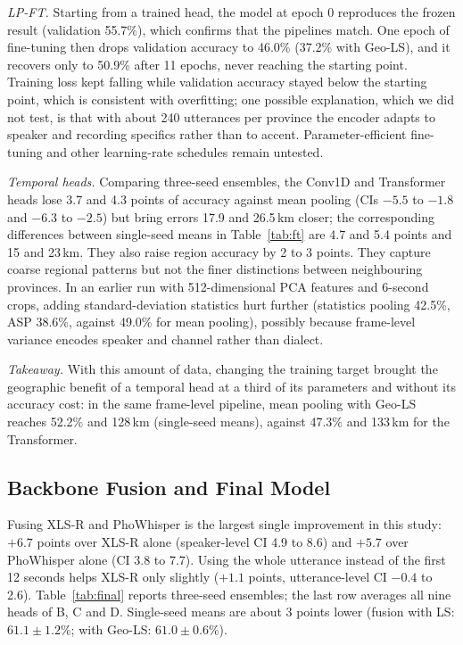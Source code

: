 \documentclass[conference]{IEEEtran}
\begin{document}
\textit{LP-FT.} Starting from a trained head, the model at epoch 0 reproduces the frozen result (validation 55.7\%), which confirms that the pipelines match. One epoch of fine-tuning then drops validation accuracy to 46.0\% (37.2\% with Geo-LS), and it recovers only to 50.9\% after 11 epochs, never reaching the starting point. Training loss kept falling while validation accuracy stayed below the starting point, which is consistent with overfitting; one possible explanation, which we did not test, is that with about 240 utterances per province the encoder adapts to speaker and recording specifics rather than to accent. Parameter-efficient fine-tuning and other learning-rate schedules remain untested.

\textit{Temporal heads.} Comparing three-seed ensembles, the Conv1D and Transformer heads lose 3.7 and 4.3 points of accuracy against mean pooling (CIs $-5.5$ to $-1.8$ and $-6.3$ to $-2.5$) but bring errors 17.9 and 26.5\,km closer; the corresponding differences between single-seed means in Table~\ref{tab:ft} are 4.7 and 5.4 points and 15 and 23\,km. They also raise region accuracy by 2 to 3 points. They capture coarse regional patterns but not the finer distinctions between neighbouring provinces. In an earlier run with 512-dimensional PCA features and 6-second crops, adding standard-deviation statistics hurt further (statistics pooling 42.5\%, ASP 38.6\%, against 49.0\% for mean pooling), possibly because frame-level variance encodes speaker and channel rather than dialect.

\textit{Takeaway.} With this amount of data, changing the training target brought the geographic benefit of a temporal head at a third of its parameters and without its accuracy cost: in the same frame-level pipeline, mean pooling with Geo-LS reaches 52.2\% and 128\,km (single-seed means), against 47.3\% and 133\,km for the Transformer.

\subsection{Backbone Fusion and Final Model}
\label{sec:final}
Fusing XLS-R and PhoWhisper is the largest single improvement in this study: $+6.7$ points over XLS-R alone (speaker-level CI 4.9 to 8.6) and $+5.7$ over PhoWhisper alone (CI 3.8 to 7.7). Using the whole utterance instead of the first 12 seconds helps XLS-R only slightly ($+1.1$ points, utterance-level CI $-0.4$ to 2.6). Table~\ref{tab:final} reports three-seed ensembles; the last row averages all nine heads of B, C and D. Single-seed means are about 3 points lower (fusion with LS: $61.1 \pm 1.2$\%; with Geo-LS: $61.0 \pm 0.6$\%).
\end{document}
